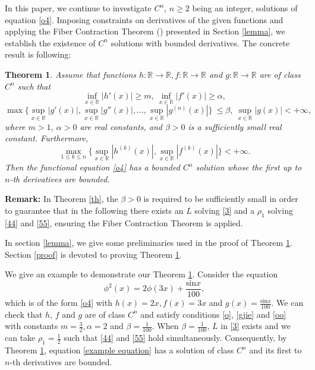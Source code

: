 \documentclass[11pt,reqno,a4paper]{amsart}
\newtheorem{theorem}{Theorem}
\numberwithin{equation}{section}
\begin{document}
In this paper, we continue to investigate  $C^n$, $n\ge 2$ being an integer, solutions of equation \eqref{o4}. Imposing constraints on  derivatives  of the given functions and applying the Fiber Contraction Theorem (\cite{VA}) presented in Section \ref{lemma}, we establish the existence of $C^n$ solutions with bounded  derivatives. The concrete result is following:
\begin{theorem}\label{th}
Assume that functions $h:\mathbb{R} \to \mathbb{R}, f:\mathbb{R} \to  \mathbb{R}$ and $g:\mathbb{R} \to \mathbb{R}$ are of class $C^{n}$ such that
\begin{equation}\label{o}
\inf_{x\in \mathbb{R}}|h'(x)|\ge m, 
~\inf_{x\in \mathbb{R}}|f'(x)|\ge \alpha,
\end{equation}
\begin{equation}\label{gjie}
\max\Big\{\sup_{x\in \mathbb{R}}|g'(x)|,\sup_{x\in \mathbb{R}}|g''(x)|,...,\sup_{x\in \mathbb{R}}|g^{(n)}(x)| \Big\}~\le \beta, ~\sup_{x\in \mathbb{R}}|g(x)|<+\infty,~
\end{equation}
 where $m > 1$, $\alpha > 0$ are real constants, and $\beta > 0$ is a sufficiently small real constant.
Furthermore, 
\begin{equation}\label{oo}
\max_{1\le k\le n}\Big\{ \sup_{x\in \mathbb{R}}|h^{(k)}(x)|,
  \sup_{x\in \mathbb{R}}|f^{(k)}(x)|
 \Big\}< +\infty.
 \end{equation}
Then the functional equation \eqref{o4}
has a bounded $C^{n}$ solution whose the first up to $n$-th derivatives are bounded.
\end{theorem}


{\bf Remark:}\label{remark} In Theorem \eqref{th}, the $\beta>0$ is required to be sufficiently small in order to guarantee that in the following there exists an $L$ solving \eqref{3} and a $\rho_1$ solving \eqref{44} and \eqref{55}, ensuring the Fiber Contraction Theorem is applied.


In section \ref{lemma}, we give some preliminaries used in the proof of Theorem \ref{th}. Section \ref{proof} is devoted to proving Theorem \ref{th}.

We give an example to demonstrate our Theorem \ref{th}.
Consider the equation 
\begin{equation}\label{example equation}
    \phi^2(x)=2\phi(3x)+\frac{\text{sin}x}{100},
\end{equation}
which is of the form \eqref{o4} with $h(x)=2x, f(x)=3x$ and $g(x)=\frac{\text{sin}x}{100}$. We can check that $h$, $f$ and $g$ are of class $C^n$ and satisfy conditions \eqref{o}, \eqref{gjie} and \eqref{oo} with constants $m=\frac{3}{2}, \alpha=2$ and $\beta=\frac{1}{100}$. When $\beta=\frac{1}{100}$, $L$ in \eqref{3} exists and we can take $\rho_1=\frac{1}{2}$ such that \eqref{44} and \eqref{55} hold simultaneously. Consequently, by Theorem \ref{th}, equation \eqref{example equation} has a
solution of class $C^n$ and its first to $n$-th derivatives are bounded.
\end{document}
